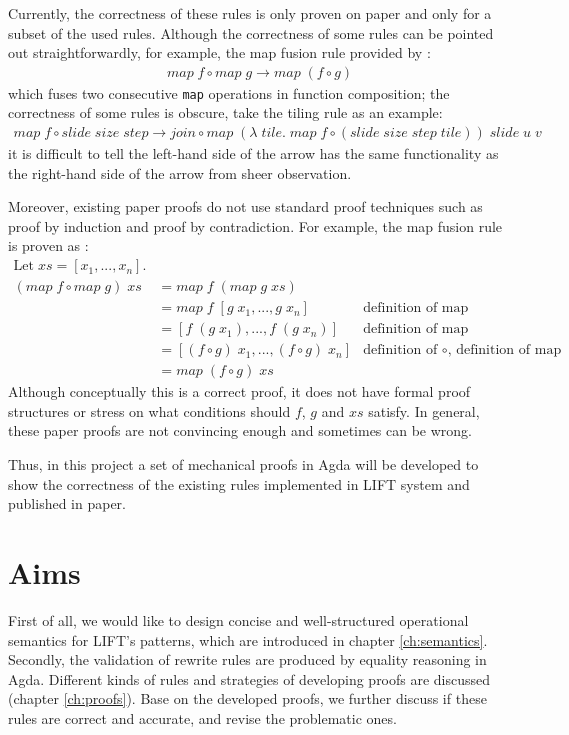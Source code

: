 \documentclass{l4proj}
\begin{document}
Currently, the correctness of these rules is only proven on paper and only for a subset of the used rules. Although the correctness of some rules can be pointed out straightforwardly, for example, the map fusion rule provided by \cite{steuwer2015improving}:
\begin{align*}
    map\; f \circ map\; g \to map\; (f \circ g)
\end{align*} 
which fuses two consecutive \texttt{map} operations in function composition; the correctness of some rules is obscure, take the tiling rule \citep{hagedorn2018high} as an example:
\begin{align*}
    map\; f \circ slide\; size\; step \to join \circ map\; (\lambda\; tile.\; map\; f \circ (slide\; size\; step\; tile))\; slide\; u\; v
\end{align*}
it is difficult to tell the left-hand side of the arrow has the same functionality as the right-hand side of the arrow from sheer observation.

Moreover, existing paper proofs do not use standard proof techniques such as proof by induction and proof by contradiction. For example, the map fusion rule is proven as \citep{steuwer2015improving}:
\begin{align*}
\mbox{Let}\; xs = [x_1, ... , x_n].\\
(map\; f \circ map\; g)\; xs &= map\; f\; (map\; g\; xs) \\
&= map\; f\; [g\; x_1, ... , g\; x_n] &\mbox{definition of map}\\
&= [f\; (g\; x_1), ... , f\; (g\; x_n)] &\mbox{definition of map}\\
&= [(f \circ g)\; x_1, ... , (f \circ g)\; x_n] &\mbox{definition of $\circ$, definition of map}\\
&= map\; (f \circ g)\; xs
\end{align*}
Although conceptually this is a correct proof, it does not have formal proof structures or stress on what conditions should $f$, $g$ and $xs$ satisfy. In general, these paper proofs are not convincing enough and sometimes can be wrong.

Thus, in this project a set of mechanical proofs in Agda will be developed to show the correctness of the existing rules implemented in LIFT system and published in paper.

\section{Aims}
First of all, we would like to design concise and well-structured operational semantics for LIFT's patterns, which are introduced in chapter \ref{ch:semantics}. Secondly, the validation of rewrite rules are produced by equality reasoning in Agda. Different kinds of rules and strategies of developing proofs are discussed (chapter \ref{ch:proofs}). Base on the developed proofs, we further discuss if these rules are correct and accurate, and revise the problematic ones.
\end{document}
